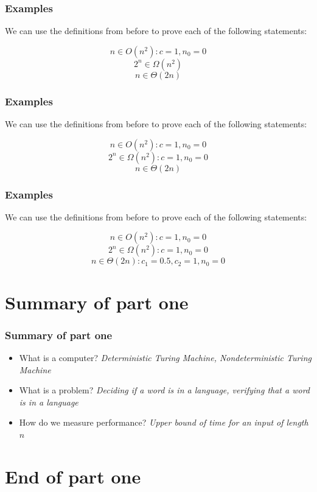 \documentclass[aspectratio=169]{beamer}
\begin{document}
\begin{frame}[noframenumbering]
\frametitle{Examples}
We can use the definitions from before to prove each of the following statements:

$$n \in O(n^2): c = 1, n_0 = 0$$
$$2^n \in \Omega(n^2)$$
$$n \in \Theta(2n)$$
\end{frame}

\begin{frame}[noframenumbering]
\frametitle{Examples}
We can use the definitions from before to prove each of the following statements:

$$n \in O(n^2): c = 1, n_0 = 0$$
$$2^n \in \Omega(n^2): c = 1, n_0 = 0$$
$$n \in \Theta(2n)$$
\end{frame}

\begin{frame}[noframenumbering]
\frametitle{Examples}
We can use the definitions from before to prove each of the following statements:

$$n \in O(n^2): c = 1, n_0 = 0$$
$$2^n \in \Omega(n^2): c = 1, n_0 = 0$$
$$n \in \Theta(2n): c_1 = 0.5, c_2 = 1, n_0 = 0$$
\end{frame}

\section{Summary of part one}

\begin{frame}
\frametitle{Summary of part one}
\begin{itemize}
    \item What is a computer? {\em Deterministic Turing Machine, Nondeterministic Turing Machine}
    \item What is a problem? {\em Deciding if a word is in a language, verifying that a word is in a language}
    \item How do we measure performance? {\em Upper bound of time for an input of length $n$}
\end{itemize}
\end{frame}

\section{End of part one}
\end{document}
